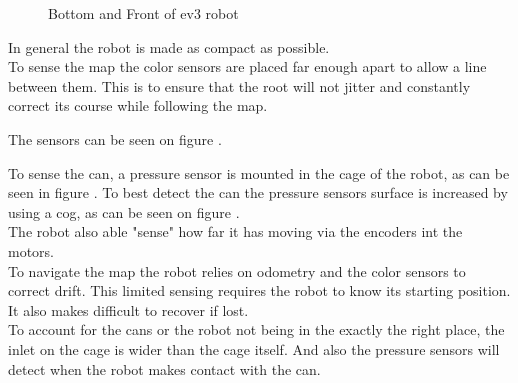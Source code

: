 \documentclass[../../main.tex]{subfiles}
\begin{document}
\begin{figure}[h]
	\centering

	\caption{Bottom and Front of ev3 robot}
	\label{fig:front_and_bottom}
\end{figure}


In general the robot is made as compact as possible.\\


To sense the map the color sensors are placed far enough apart to allow a line between them.
This is to ensure that the root will not jitter and constantly correct its course while
following the map.

The sensors can be seen on figure .

To sense the can, a pressure sensor is mounted in the cage of the robot, as can be seen in figure
. To best detect the can the pressure sensors surface is increased by using
a cog, as can be seen on figure .\\

The robot also able "sense" how far it has moving via the encoders int the motors.\\

To navigate the map the robot relies on odometry and the color sensors to correct drift.
This limited sensing requires the robot to know its starting position. It also makes difficult
to recover if lost.\\

To account for the cans or the robot  not being in the exactly the right place, the inlet on the cage
is wider than the cage itself. And also the pressure sensors will detect when the robot makes 
contact with the can.
	
\end{document}
